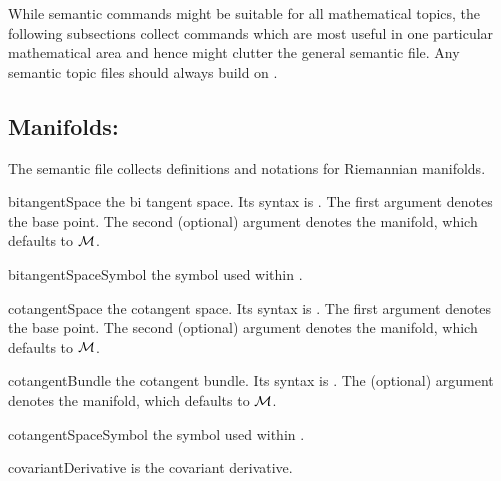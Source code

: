\documentclass[english,a4paper,DIV=12,parskip=full,oneside]{scrartcl}
\begin{document}
While semantic commands might be suitable for all mathematical topics, the following subsections collect commands which are most useful in one particular mathematical area and hence might clutter the general semantic file.
Any semantic topic files should always build on .


\subsection{Manifolds: \texorpdfstring{}{mathsemantics-manifolds.sty}}\label{subsec:manifolds}

The semantic file  collects definitions and notations for Riemannian manifolds.
\begin{commandlist}
	\item[bitangentSpace] the bi tangent space.
		Its syntax is .
		The first argument denotes the base point.
		The second (optional) argument denotes the manifold, which defaults to $\mathcal{M}$.
		\par{}
		\par{}
	\item[bitangentSpaceSymbol] the symbol used within \codeCommand{\bitangentSpace}.
		\par\mathCodeExample{\bitangentSpaceSymbol}
	\item[cotangentSpace] the cotangent space.
		Its syntax is .
		The first argument denotes the base point.
		The second (optional) argument denotes the manifold, which defaults to $\mathcal{M}$.
		\par{}
		\par{}
	\item[cotangentBundle] the cotangent bundle.
		Its syntax is \codeCommand{\cotangentBundle[#1]}.
		The (optional) argument denotes the manifold, which defaults to $\mathcal{M}$.
		\par\mathCodeExample{\cotangentBundle}
		\par\mathCodeExample{\cotangentBundle[\cN]}
	\item[cotangentSpaceSymbol] the symbol used within \codeCommand{\cotangent}.
		\par\mathCodeExample{\cotangentSpaceSymbol}
	\item[covariantDerivative] is the covariant derivative.

\end{commandlist}
\end{document}
